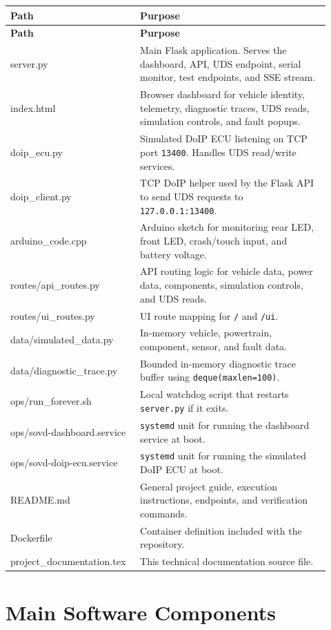 \documentclass[a4paper,10pt,titlepage,oneside]{article}
\begin{document}
\begin{longtable}{>{\ttfamily}p{0.34\linewidth} p{0.58\linewidth}}
\textbf{Path} & \textbf{Purpose} \\
\hline
\endfirsthead
\textbf{Path} & \textbf{Purpose} \\
\hline
\endhead
server.py & Main Flask application. Serves the dashboard, API, UDS endpoint, serial monitor, test endpoints, and SSE stream. \\
index.html & Browser dashboard for vehicle identity, telemetry, diagnostic traces, UDS reads, simulation controls, and fault popups. \\
doip\_ecu.py & Simulated DoIP ECU listening on TCP port \texttt{13400}. Handles UDS read/write services. \\
doip\_client.py & TCP DoIP helper used by the Flask API to send UDS requests to \texttt{127.0.0.1:13400}. \\
arduino\_code.cpp & Arduino sketch for monitoring rear LED, front LED, crash/touch input, and battery voltage. \\
routes/api\_routes.py & API routing logic for vehicle data, power data, components, simulation controls, and UDS reads. \\
routes/ui\_routes.py & UI route mapping for \texttt{/} and \texttt{/ui}. \\
data/simulated\_data.py & In-memory vehicle, powertrain, component, sensor, and fault data. \\
data/diagnostic\_trace.py & Bounded in-memory diagnostic trace buffer using \texttt{deque(maxlen=100)}. \\
ops/run\_forever.sh & Local watchdog script that restarts \texttt{server.py} if it exits. \\
ops/sovd-dashboard.service & \texttt{systemd} unit for running the dashboard service at boot. \\
ops/sovd-doip-ecu.service & \texttt{systemd} unit for running the simulated DoIP ECU at boot. \\
README.md & General project guide, execution instructions, endpoints, and verification commands. \\
Dockerfile & Container definition included with the repository. \\
project\_documentation.tex & This technical documentation source file. \\
\end{longtable}

\section{Main Software Components}
\end{document}
